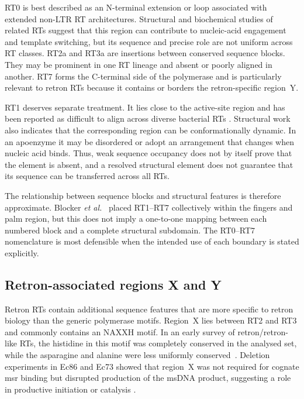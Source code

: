 RT0 is best described as an N-terminal extension or loop associated with
extended non-LTR RT architectures. Structural and biochemical studies of
related RTs suggest that this region can contribute to nucleic-acid engagement
and template switching, but its sequence and precise role are not uniform
across RT classes. RT2a and RT3a are insertions between conserved sequence
blocks. They may be prominent in one RT lineage and absent or poorly aligned
in another. RT7 forms the C-terminal side of the polymerase and is particularly
relevant to retron RTs because it contains or borders the retron-specific
region~Y.

RT1 deserves separate treatment. It lies close to the active-site region and
has been reported as difficult to align across diverse bacterial RTs
\cite{simon2008}. Structural work also indicates that the corresponding region
can be conformationally dynamic. In an apoenzyme it may be disordered or adopt
an arrangement that changes when nucleic acid binds. Thus, weak sequence
occupancy does not by itself prove that the element is absent, and a resolved
structural element does not guarantee that its sequence can be transferred
across all RTs.

The relationship between sequence blocks and structural features is therefore
approximate. Blocker \textit{et al.}~\cite{blocker2005} placed RT1--RT7
collectively within the fingers and palm region, but this does not imply a
one-to-one mapping between each numbered block and a complete structural
subdomain. The RT0--RT7 nomenclature is most defensible when the intended use
of each boundary is stated explicitly.

\subsection{Retron-associated regions X and Y}

Retron RTs contain additional sequence features that are more specific to
retron biology than the generic polymerase motifs. Region~X lies between RT2
and RT3 and commonly contains an NAXXH motif. In an early survey of
retron/retron-like RTs, the histidine in this motif was completely conserved in
the analysed set, while the asparagine and alanine were less uniformly
conserved~\cite{toro2014}. Deletion experiments in Ec86 and Ec73 showed that
region~X was not required for cognate msr binding but disrupted production of
the msDNA product, suggesting a role in productive initiation or catalysis
\cite{mestre2020}.

